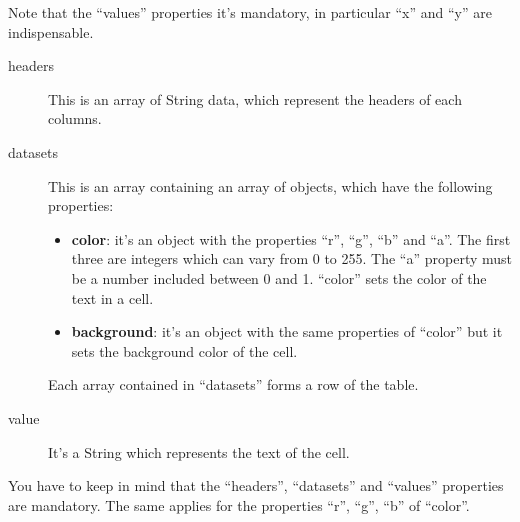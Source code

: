 		Note that the “values” properties it's mandatory, in particular “x” and “y” are indispensable.
		\begin{description}
			\item[headers] This is an array of String data, which represent the headers of each columns.
			\item[datasets] This is an array containing an array of objects, which have the following properties:
			\begin{itemize}
				\item \textbf{color}: it's an object with the properties “r”, “g”, “b” and “a”. The first three are integers which can vary from 0 to 255. The “a” property must be a number included between 0 and 1.
				“color” sets the color of the text in a cell.
				\item \textbf{background}: it's an object with the same properties of “color” but it sets the background color of the cell.
			\end{itemize}
			Each array contained in “datasets” forms a row of the table.
			\item[value] It's a String which represents the text of the cell.
		\end{description}
		You have to keep in mind that the “headers”, “datasets” and “values” properties are mandatory. The same applies for the properties “r”, “g”, “b” of “color”.

